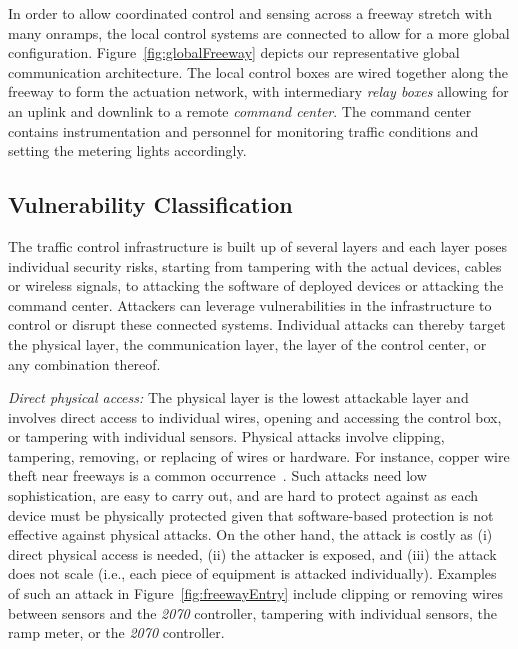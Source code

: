     		In order to allow coordinated control and sensing across a freeway stretch with many onramps, the local control systems are connected to allow for a more global configuration. Figure~\ref{fig:globalFreeway} depicts our representative global communication architecture. The local control boxes are wired together along the freeway to form the actuation network, with intermediary \emph{relay boxes} allowing for an uplink and downlink to a remote \emph{command center}. The command center contains instrumentation and personnel for monitoring traffic conditions and setting the metering lights accordingly.

\subsection{Vulnerability Classification}
\label{sec:traffic-system-vulnerabilities}

    The traffic control infrastructure is built up of several layers and each layer poses individual security risks, starting from tampering with the actual devices, cables or wireless signals, to attacking the software of deployed devices or attacking the command center.
    Attackers can leverage vulnerabilities in the infrastructure to control or disrupt these
    connected systems. Individual attacks can thereby target the physical layer, the
    communication layer, the layer of the control center, or any combination
    thereof.
    
    \emph{Direct physical access:}
    The physical layer is the lowest attackable layer and involves direct access to
    individual wires, opening and accessing the control box, or tampering with
    individual sensors. Physical attacks involve clipping, tampering, removing, or
    replacing of wires or hardware. For instance, copper wire theft near freeways is a common occurrence~\cite{Sutton2014Custom,Rosenberg2014Custom}. Such attacks need low sophistication, are
    easy to carry out, and are hard to protect against as each device must be physically
    protected given that software-based protection is not effective against physical
    attacks. On the other hand, the attack is costly as (i) direct physical access
    is needed, (ii) the attacker is exposed, and (iii) the attack does not scale
    (i.e., each piece of equipment is attacked individually). Examples of such an
    attack in Figure~\ref{fig:freewayEntry} include clipping or removing wires
    between sensors and the \emph{2070} controller, tampering with individual sensors, the
    ramp meter, or the \emph{2070} controller.

